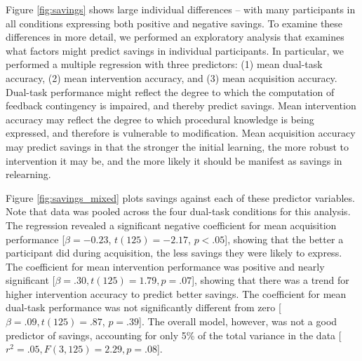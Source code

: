 \documentclass[man,apacite,draftfirst]{apa6}
\begin{document}
Figure \ref{fig:savings} shows large individual differences -- with many
participants in all conditions expressing both positive and negative savings.
To examine these differences in more detail, we performed an exploratory analysis that examines what factors might predict savings in individual participants. In particular, we
performed a multiple regression with three predictors: (1) mean dual-task
accuracy, (2) mean intervention accuracy, and (3) mean acquisition accuracy.
Dual-task performance might reflect the degree to which the computation of
feedback contingency is impaired, and thereby predict savings. Mean intervention
accuracy may reflect the degree to which procedural knowledge is being
expressed, and therefore is vulnerable to modification. Mean acquisition
accuracy may predict savings in that the stronger the initial learning, the more
robust to intervention it may be, and the more likely it should be manifest as
savings in relearning.

Figure \ref{fig:savings_mixed} plots savings against each of these predictor
variables. Note that data was pooled across the four dual-task conditions for
this analysis. The regression revealed a significant negative coefficient for
mean acquisition performance [$\beta=-0.23$, $t(125)=-2.17$, $p<.05$], showing that
the better a participant did during acquisition, the less savings they were
likely to express. The coefficient for mean intervention performance was
positive and nearly significant [$\beta=.30, t(125)=1.79, p=.07$], showing that
there was a trend for higher intervention accuracy to predict better savings.
The coefficient for mean dual-task performance was not significantly different
from zero [$\beta=.09, t(125)=.87$, $p=.39$]. The overall model, however, was not
a good predictor of savings, accounting for only 5\% of the total variance in the data [$r^2=.05, F(3,125)=2.29, p=.08$].

\end{document}
